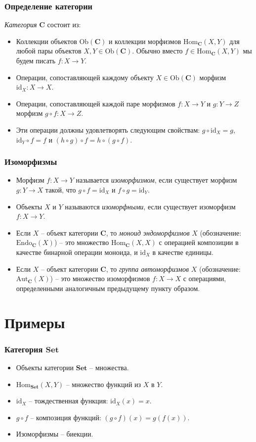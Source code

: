 \documentclass{beamer}
\newcommand{\cat}[1]{\mathbf{#1}}
\renewcommand{\C}{\cat{C}}
\newcommand{\Set}{\cat{Set}}
\newcommand{\fs}[1]{\mathrm{#1}}
\newcommand{\Ob}{\fs{Ob}}
\newcommand{\Hom}{\fs{Hom}}
\newcommand{\id}{\fs{id}}
\begin{document}
\begin{frame}
\frametitle{Определение категории}
\emph{Категория} $\C$ состоит из:
\begin{itemize}
\item Коллекции объектов $\Ob(\C)$ и коллекции морфизмов $\Hom_\C(X, Y)$ для любой пары объектов $X, Y \in \Ob(\C)$.
    Обычно вместо $f \in \Hom_\C(X, Y)$ мы будем писать $f : X \to Y$.
\item Операции, сопоставляющей каждому объекту $X \in \Ob(\C)$ морфизм $\id_X : X \to X$.
\item Операции, сопоставляющей каждой паре морфизмов $f : X \to Y$ и $g : Y \to Z$ морфизм $g \circ f : X \to Z$.
\item Эти операции должны удовлетворять следующим свойствам: $g \circ \id_X = g$, $\id_Y \circ f = f$ и $(h \circ g) \circ f = h \circ (g \circ f)$.
\end{itemize}
\end{frame}

\begin{frame}
\frametitle{Изоморфизмы}
\begin{itemize}
\item Морфизм $f : X \to Y$ называется \emph{изоморфизмом}, если существует морфизм $g : Y \to X$ такой, что $g \circ f = \id_X$ и $f \circ g = \id_Y$.
\item Объекты $X$ и $Y$ называются \emph{изоморфными}, если существует изоморфизм $f : X \to Y$.
\item Если $X$ -- объект категории $\C$, то \emph{моноид эндоморфизмов} $X$ (обозначение: $\fs{Endo}_\C(X)$) -- это множество $\Hom_\C(X, X)$ с операцией композиции в качестве бинарной операции моноида, и $\id_X$ в качестве единицы.
\item Если $X$ -- объект категории $\C$, то \emph{группа автоморфизмов} $X$ (обозначение: $\fs{Aut}_\C(X)$) -- это множество изоморфизмов $f : X \to X$ с операциями, определенными аналогичным предыдущему пункту образом.
\end{itemize}
\end{frame}

\section{Примеры}

\begin{frame}
\frametitle{Категория $\Set$}
\begin{itemize}
\item Объекты категории $\Set$ -- множества.
\item $\Hom_\Set(X, Y)$ -- множество функций из $X$ в $Y$.
\item $\id_X$ -- тождественная функция: $\id_X(x) = x$.
\item $g \circ f$ -- композиция функций: $(g \circ f)(x) = g(f(x))$.
\item Изоморфизмы -- биекции.
\end{itemize}
\end{frame}
\end{document}
